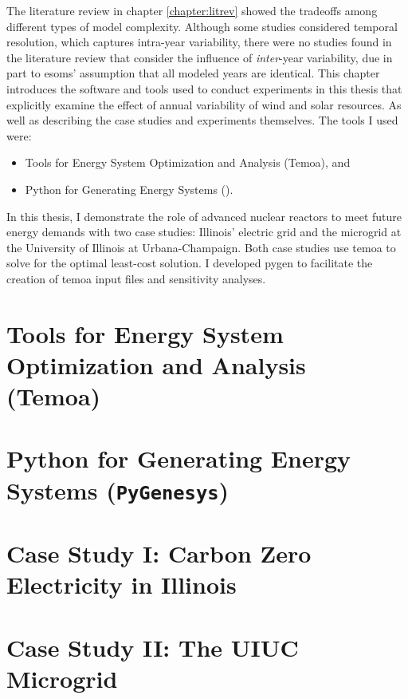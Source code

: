 The literature review in chapter \ref{chapter:litrev} showed the tradeoffs among
different types of model complexity. Although some studies considered temporal
resolution, which captures intra-year variability, there were no studies found in
the literature review that consider the influence of \textit{inter}-year variability,
due in part to \glspl{esom}' assumption that all modeled years are identical.
This chapter introduces the software and tools used to conduct experiments in this
thesis that explicitly examine the effect of annual variability of wind and solar
resources. As well as describing the case studies and experiments themselves.
The tools I used were:
\begin{itemize}
  \item Tools for Energy System Optimization and Analysis (Temoa), and
  \item Python for Generating Energy Systems (\pygen).
\end{itemize}
In this thesis, I demonstrate the role of advanced nuclear reactors to meet future
energy demands with two case studies: Illinois’ electric grid and the microgrid
at the University of Illinois at Urbana-Champaign. Both case studies use \gls{temoa}
to solve for the optimal least-cost solution. I developed \gls{pygen} to
facilitate the creation of \gls{temoa} input files and sensitivity analyses.

\section{Tools for Energy System Optimization and Analysis (Temoa)}


\section{Python for Generating Energy Systems (\texttt{PyGenesys})}



\section{Case Study I: Carbon Zero Electricity in Illinois}
\label{section:ilmodel}


\section{Case Study II: The UIUC Microgrid}
\label{section:uiucmodel}


